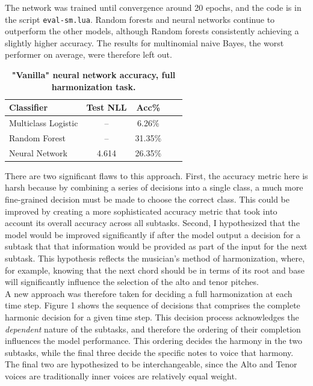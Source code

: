 \documentclass[11pt]{article}
\begin{document}
The network was trained until convergence around 20 epochs, and the code is in the script \texttt{eval-sm.lua}. Random forests and neural networks continue to outperform the other models, although Random forests consistently achieving a slightly higher accuracy. The results for multinomial naive Bayes, the worst performer on average, were therefore left out. \\

 \begin{table}[h]
\begin{center}
\caption[Table caption text]{\textbf{"Vanilla" neural network accuracy, full harmonization task.}}
\begin{tabular}{l *{4}{c}}
Classifier & Test NLL & Acc\% \\ \hline
Multiclass Logistic & -- & 6.26\% \\
Random Forest & -- & 31.35\% \\
Neural Network & 4.614 & 26.35\% \\
\end{tabular}
\end{center}
\end{table}

There are two significant flaws to this approach. First, the accuracy metric here is harsh because by combining a series of decisions into a single class, a much more fine-grained decision must be made to choose the correct class. This could be improved by creating a more sophisticated accuracy metric that took into account its overall accuracy across all subtasks. Second, I hypothesized that the model would be improved significantly if after the model output a decision for a subtask that that information would be provided as part of the input for the next subtask. This hypothesis reflects the musician's method of harmonization, where, for example, knowing that the next chord should be in terms of its root and base will significantly influence the selection of the alto and tenor pitches. \\

A new approach was therefore taken for deciding a full harmonization at each time step. Figure 1 shows the sequence of decisions that comprises the complete harmonic decision for a given time step. This decision process acknowledges the \textit{dependent} nature of the subtasks, and therefore the ordering of their completion influences the model performance. This ordering decides the harmony in the two subtasks, while the final three decide the specific notes to voice that harmony. The final two are hypothesized to be interchangeable, since the Alto and Tenor voices are traditionally inner voices are relatively equal weight.
\end{document}
